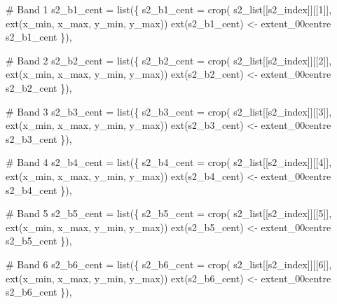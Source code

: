 \documentclass[
  letterpaper,
  DIV=11,
  numbers=noendperiod]{scrartcl}
\newenvironment{Shaded}{\begin{snugshade}}{\end{snugshade}}
\newcommand{\AttributeTok}[1]{\textcolor[rgb]{0.40,0.45,0.13}{#1}}
\newcommand{\CommentTok}[1]{\textcolor[rgb]{0.37,0.37,0.37}{#1}}
\newcommand{\DecValTok}[1]{\textcolor[rgb]{0.68,0.00,0.00}{#1}}
\newcommand{\FunctionTok}[1]{\textcolor[rgb]{0.28,0.35,0.67}{#1}}
\newcommand{\NormalTok}[1]{\textcolor[rgb]{0.00,0.23,0.31}{#1}}
\newcommand{\OtherTok}[1]{\textcolor[rgb]{0.00,0.23,0.31}{#1}}
\begin{document}
\begin{Shaded}
\begin{Highlighting}[]
    \CommentTok{\# Band 1}
    \AttributeTok{s2\_b1\_cent =} \FunctionTok{list}\NormalTok{(\{}
\NormalTok{      s2\_b1\_cent }\OtherTok{=} \FunctionTok{crop}\NormalTok{( s2\_list[[s2\_index]][[}\DecValTok{1}\NormalTok{]], }\FunctionTok{ext}\NormalTok{(x\_min, x\_max, y\_min, y\_max))}
      \FunctionTok{ext}\NormalTok{(s2\_b1\_cent) }\OtherTok{\textless{}{-}}\NormalTok{ extent\_00centre}
\NormalTok{      s2\_b1\_cent}
\NormalTok{      \}),}
    
    \CommentTok{\# Band 2}
    \AttributeTok{s2\_b2\_cent =} \FunctionTok{list}\NormalTok{(\{}
\NormalTok{      s2\_b2\_cent }\OtherTok{=} \FunctionTok{crop}\NormalTok{( s2\_list[[s2\_index]][[}\DecValTok{2}\NormalTok{]], }\FunctionTok{ext}\NormalTok{(x\_min, x\_max, y\_min, y\_max))}
      \FunctionTok{ext}\NormalTok{(s2\_b2\_cent) }\OtherTok{\textless{}{-}}\NormalTok{ extent\_00centre}
\NormalTok{      s2\_b2\_cent}
\NormalTok{      \}),}
    
    \CommentTok{\# Band 3}
    \AttributeTok{s2\_b3\_cent =} \FunctionTok{list}\NormalTok{(\{}
\NormalTok{      s2\_b3\_cent }\OtherTok{=} \FunctionTok{crop}\NormalTok{( s2\_list[[s2\_index]][[}\DecValTok{3}\NormalTok{]], }\FunctionTok{ext}\NormalTok{(x\_min, x\_max, y\_min, y\_max))}
      \FunctionTok{ext}\NormalTok{(s2\_b3\_cent) }\OtherTok{\textless{}{-}}\NormalTok{ extent\_00centre}
\NormalTok{      s2\_b3\_cent}
\NormalTok{      \}),}
    
    \CommentTok{\# Band 4}
    \AttributeTok{s2\_b4\_cent =} \FunctionTok{list}\NormalTok{(\{}
\NormalTok{      s2\_b4\_cent }\OtherTok{=} \FunctionTok{crop}\NormalTok{( s2\_list[[s2\_index]][[}\DecValTok{4}\NormalTok{]], }\FunctionTok{ext}\NormalTok{(x\_min, x\_max, y\_min, y\_max))}
      \FunctionTok{ext}\NormalTok{(s2\_b4\_cent) }\OtherTok{\textless{}{-}}\NormalTok{ extent\_00centre}
\NormalTok{      s2\_b4\_cent}
\NormalTok{      \}),}
    
    \CommentTok{\# Band 5}
    \AttributeTok{s2\_b5\_cent =} \FunctionTok{list}\NormalTok{(\{}
\NormalTok{      s2\_b5\_cent }\OtherTok{=} \FunctionTok{crop}\NormalTok{( s2\_list[[s2\_index]][[}\DecValTok{5}\NormalTok{]], }\FunctionTok{ext}\NormalTok{(x\_min, x\_max, y\_min, y\_max))}
      \FunctionTok{ext}\NormalTok{(s2\_b5\_cent) }\OtherTok{\textless{}{-}}\NormalTok{ extent\_00centre}
\NormalTok{      s2\_b5\_cent}
\NormalTok{      \}),}
    
    \CommentTok{\# Band 6}
    \AttributeTok{s2\_b6\_cent =} \FunctionTok{list}\NormalTok{(\{}
\NormalTok{      s2\_b6\_cent }\OtherTok{=} \FunctionTok{crop}\NormalTok{( s2\_list[[s2\_index]][[}\DecValTok{6}\NormalTok{]], }\FunctionTok{ext}\NormalTok{(x\_min, x\_max, y\_min, y\_max))}
      \FunctionTok{ext}\NormalTok{(s2\_b6\_cent) }\OtherTok{\textless{}{-}}\NormalTok{ extent\_00centre}
\NormalTok{      s2\_b6\_cent}
\NormalTok{      \}),}
    

\end{Highlighting}
\end{Shaded}
\end{document}

